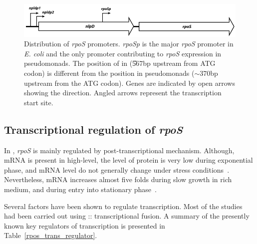 \begin{figure}[tbp]
\begin{narrow}{-1in}{-1in}
\centering
\includegraphics{figures/chap1_rpos_promoter}
\end{narrow}
\caption[Distribution of \emph{rpoS} promoters]{Distribution of
\emph{rpoS} promoters.  \emph{rpoSp} is the major \emph{rpoS}
promoter in \emph{E. coli} and the only promoter contributing to
\emph{rpoS} expression in pseudomonads. The position of 
in  (\U{567}{bp} upstream from ATG codon) is different
from the position in pseudomonads (\U{$\sim$370}{bp} upstream from
the ATG codon). Genes are indicated by open arrows showing the
direction. Angled arrows represent the transcription start site.}
\label{chap1:rpos_promoter}
\end{figure}


\subsection{Transcriptional regulation of \emph{rpoS}}

In , \emph{rpoS} is mainly regulated by
post-transcriptional mechanism. Although,  mRNA is present
in high-level, the level of \sigs{} protein is very low during
exponential phase, and mRNA level do not generally change under
stress conditions~\citep{Hengge2002}. Nevertheless,  mRNA
increases almost five folds during slow growth in rich medium, and
during entry into stationary
phase~\citep{Lange1991,Lange1994,McCann1993,Mulvey1990,Schellhorn1992,Takayanagi1994}.

Several factors have been shown to regulate 
transcription. Most of the studies had been carried out using
:: transcriptional fusion. A summary of the
presently known key regulators of  transcription is
presented in Table~\ref{rpos_trans_regulator}.

